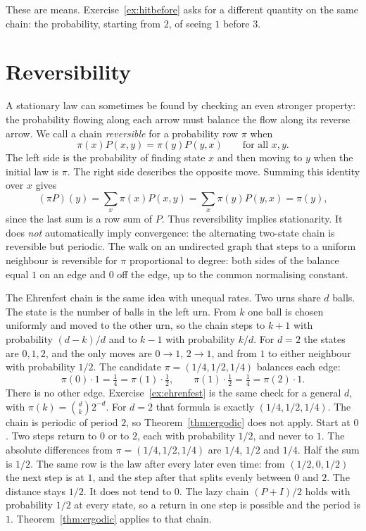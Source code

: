 These are means. Exercise~\ref{ex:hitbefore} asks for a different quantity on the same chain: the probability, starting from $2$, of seeing $1$ before $3$.

\section{Reversibility}

A stationary law can sometimes be found by checking an even stronger property: the probability flowing along each arrow must balance the flow along its reverse arrow. We call a chain \emph{reversible} for a probability row $\pi$ when
\[
 \pi(x)P(x,y)=\pi(y)P(y,x)\qquad\text{for all }x,y.
\]
The left side is the probability of finding state $x$ and then moving to $y$ when the initial law is $\pi$. The right side describes the opposite move. Summing this identity over $x$ gives
\[
 (\pi P)(y)=\sum_x\pi(x)P(x,y)
           =\sum_x\pi(y)P(y,x)=\pi(y),
\]
since the last sum is a row sum of $P$. Thus reversibility implies stationarity. It does \emph{not} automatically imply convergence: the alternating two-state chain is reversible but periodic. The walk on an undirected graph that steps to a uniform neighbour is reversible for $\pi$ proportional to degree: both sides of the balance equal $1$ on an edge and $0$ off the edge, up to the common normalising constant.

The Ehrenfest chain is the same idea with unequal rates. Two urns share $d$ balls. The state is the number of balls in the left urn. From $k$ one ball is chosen uniformly and moved to the other urn, so the chain steps to $k+1$ with probability $(d-k)/d$ and to $k-1$ with probability $k/d$. For $d=2$ the states are $0,1,2$, and the only moves are $0\to1$, $2\to1$, and from $1$ to either neighbour with probability $1/2$. The candidate $\pi=(1/4,1/2,1/4)$ balances each edge:
\[
 \pi(0)\cdot 1=\tfrac14=\pi(1)\cdot\tfrac12,\qquad \pi(1)\cdot\tfrac12=\tfrac14=\pi(2)\cdot 1.
\]
There is no other edge. Exercise~\ref{ex:ehrenfest} is the same check for a general $d$, with $\pi(k)=\binom{d}{k}2^{-d}$. For $d=2$ that formula is exactly $(1/4,1/2,1/4)$. The chain is periodic of period $2$, so Theorem~\ref{thm:ergodic} does not apply. Start at $0$. Two steps return to $0$ or to $2$, each with probability $1/2$, and never to $1$. The absolute differences from $\pi=(1/4,1/2,1/4)$ are $1/4$, $1/2$ and $1/4$. Half the sum is $1/2$. The same row is the law after every later even time: from $(1/2,0,1/2)$ the next step is at $1$, and the step after that splits evenly between $0$ and $2$. The distance stays $1/2$. It does not tend to $0$. The lazy chain $(P+I)/2$ holds with probability $1/2$ at every state, so a return in one step is possible and the period is $1$. Theorem~\ref{thm:ergodic} applies to that chain.

